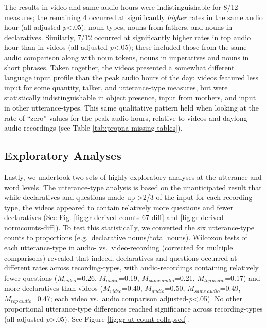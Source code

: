 \documentclass[man]{apa6}
\theoremstyle{definition}
\theoremstyle{definition}
\theoremstyle{definition}
\theoremstyle{remark}
\begin{document}
The results in video and same audio hours were indistinguishable for
8/12 measures; the remaining 4 occurred at significantly \emph{higher}
rates in the same audio hour (all adjusted-\emph{p}\textless{}.05): noun
types, nouns from fathers, and nouns in declaratives. Similarly, 7/12
occurred at significantly higher rates in top audio hour than in videos
(all adjusted-\emph{p}\textless{}.05); these included those from the
same audio comparison along with noun tokens, nouns in imperatives and
nouns in short phrases. Taken together, the videos presented a somewhat
different language input profile than the peak audio hours of the day:
videos featured less input for some quantity, talker, and utterance-type
measures, but were statistically indistinguishable in object presence,
input from mothers, and input in other utterance-types. This same
qualitative pattern held when looking at the rate of \enquote{zero}
values for the peak audio hours, relative to videos and daylong
audio-recordings (see Table \ref{tab:propna-missing-tables}).

\hypertarget{exploratory-analyses}{%
\subsection{Exploratory Analyses}\label{exploratory-analyses}}

Lastly, we undertook two sets of highly exploratory analyses at the
utterance and word levels. The utterance-type analysis is based on the
unanticipated result that while declaratives and questions made up
\textgreater{}2/3 of the input for each recording-type, the videos
appeared to contain relatively more questions and fewer declaratives
(See Fig. \ref{fig:gr-derived-counts-67-diff} and
\ref{fig:gr-derived-normcounts-diff}). To test this statistically, we
converted the six utterance-type counts to proportions (e.g.~declarative
nouns/total nouns). Wilcoxon tests of each utterance-type in audio-
vs.~video-recording (corrected for multiple comparisons) revealed that
indeed, declaratives and questions occurred at different rates across
recording-types, with audio-recordings containing relatively fewer
questions (\(M_{video}\)=0.26, \(M_{audio}\)=0.19,
\(M_{same\  audio}\)=0.21, \(M_{top\  audio}\)=0.17) and more
declaratives than videos (\(M_{video}\)=0.40, \(M_{audio}\)=0.50,
\(M_{same\  audio}\)=0.49, \(M_{top\ audio}\)=0.47; each video vs.~audio
comparison adjusted-\emph{p}\textless{}.05). No other proportional
utterance-type differences reached significance across recording-types
(all adjusted-\emph{p}\textgreater{}.05). See Figure
\ref{fig:gr-ut-count-collapsed}.
\end{document}
